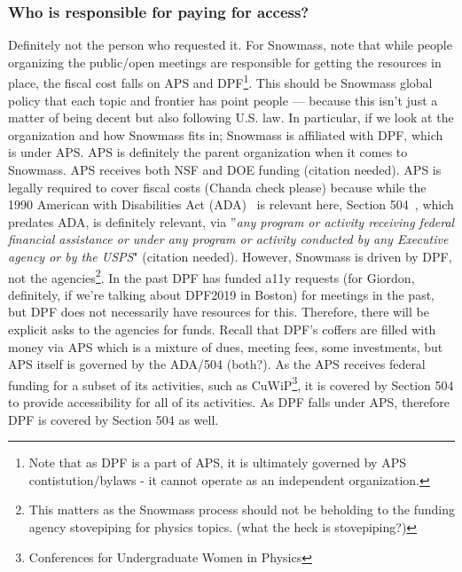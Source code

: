 \documentclass{article}
\begin{document}
  \subsubsection{Who is responsible for paying for access?}

  Definitely not the person who requested it. For Snowmass, note that while people organizing the public/open meetings are responsible for getting the resources in place, the fiscal cost falls on APS and DPF\footnote{Note that as DPF is a part of APS, it is ultimately governed by APS contistution/bylaws - it cannot operate as an independent organization.}. This should be Snowmass global policy that each topic and frontier has point people — because this isn’t just a matter of being decent but also following U.S. law. In particular, if we look at the organization and how Snowmass fits in; Snowmass is affiliated with DPF, which is under APS. APS is definitely the parent organization when it comes to Snowmass. APS receives both NSF and DOE funding (citation needed). APS is legally required to cover fiscal costs (Chanda check please) because while the 1990 American with Disabilities Act (ADA)~\cite{ADA1991} is relevant here, Section 504~\cite{504}, which predates ADA, is definitely relevant, via ''\textsl{any program or activity receiving federal financial assistance or under any program or activity conducted by any Executive agency or by the USPS}" (citation needed). However, Snowmass is driven by DPF, not the agencies\footnote{This matters as the Snowmass process should not be beholding to the funding agency stovepiping for physics topics. (what the heck is stovepiping?)}. In the past DPF has funded a11y requests (for Giordon, definitely, if we're talking about DPF2019 in Boston) for meetings in the past, but DPF does not necessarily have resources for this. Therefore, there will be explicit asks to the agencies for funds. Recall that DPF's coffers are filled with money via APS which is a mixture of dues, meeting fees, some investments, but APS itself is governed by the ADA/504 (both?). As the APS receives federal funding for a subset of its activities, such as CuWiP\footnote{Conferences for Undergraduate Women in Physics}, it is covered by Section 504 to provide accessibility for all of its activities. As DPF falls under APS, therefore DPF is covered by Section 504 as well.
\end{document}
